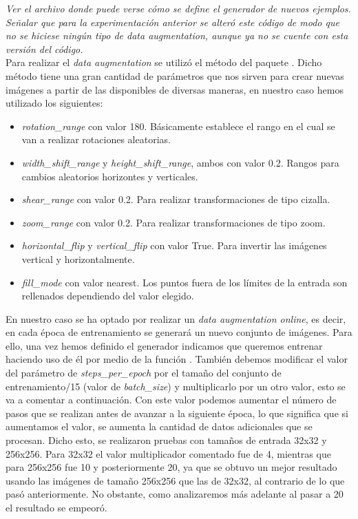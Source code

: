 \emph{Ver el archivo  donde puede verse cómo se define el generador de nuevos ejemplos. Señalar que para la experimentación anterior se alteró este código de modo que no se hiciese ningún tipo de \textit{data augmentation}, aunque ya no se cuente con esta versión del código.}\\

Para realizar el \textit{data augmentation} se utilizó el método  del paquete . Dicho método tiene una gran cantidad de parámetros que nos sirven para crear nuevas imágenes a partir de las disponibles de diversas maneras, en nuestro caso hemos utilizado los siguientes:

\begin{itemize}
\item \textit{rotation\_range} con valor 180. Básicamente establece el rango en el cual se van a realizar rotaciones aleatorias.
\item \textit{width\_shift\_range} y \textit{height\_shift\_range}, ambos con valor 0.2. Rangos para cambios aleatorios horizontes y verticales.
\item \textit{shear\_range} con valor 0.2. Para realizar transformaciones de tipo cizalla.
\item \textit{zoom\_range} con valor 0.2. Para realizar transformaciones de tipo zoom.
\item \textit{horizontal\_flip} y \textit{vertical\_flip} con valor True. Para invertir las imágenes vertical y horizontalmente.
\item \textit{fill\_mode} con valor nearest. Los puntos fuera de los límites de la entrada son rellenados dependiendo del valor elegido.
\end{itemize}

En nuestro caso se ha optado por realizar un \textit{data augmentation online}, es decir, en cada época de entrenamiento se generará un nuevo conjunto de imágenes. Para ello, una vez hemos definido el generador indicamos que queremos entrenar haciendo uso de él por medio de la función . También debemos modificar el valor del parámetro de \textit{steps\_per\_epoch} por el tamaño del conjunto de entrenamiento/15 (valor de \textit{batch\_size}) y multiplicarlo por un otro valor, esto se va a comentar a continuación. Con este valor podemos aumentar el número de pasos que se realizan antes de avanzar a la siguiente época, lo que significa que si aumentamos el valor, se aumenta la cantidad de datos adicionales que se procesan. Dicho esto, se realizaron pruebas con tamaños de entrada 32x32 y 256x256. Para 32x32 el valor multiplicador comentado fue de 4, mientras que para 256x256 fue 10 y posteriormente 20, ya que se obtuvo un mejor resultado usando las imágenes de tamaño 256x256 que las de 32x32, al contrario de lo que pasó anteriormente. No obstante, como analizaremos más adelante al pasar a 20 el resultado se empeoró.

